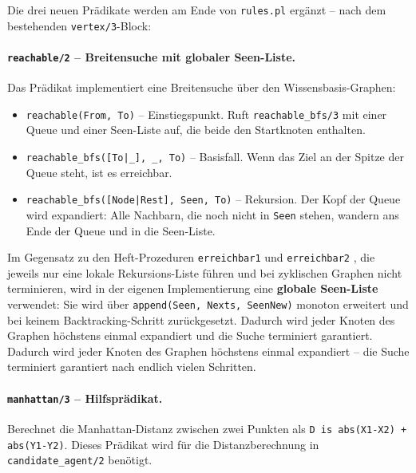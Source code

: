 Die drei neuen Prädikate werden am Ende von \texttt{rules.pl} ergänzt -- nach dem bestehenden \texttt{vertex/3}-Block:



\paragraph{\texttt{reachable/2} – Breitensuche mit globaler Seen-Liste.}
Das Prädikat implementiert eine Breitensuche über den Wissensbasis-Graphen:

\begin{itemize}
    \item \texttt{reachable(From, To)} -- Einstiegspunkt. Ruft \texttt{reachable\_bfs/3} mit einer Queue und einer Seen-Liste auf, die beide den Startknoten enthalten.
    \item \texttt{reachable\_bfs([To|\_], \_, To)} -- Basisfall. Wenn das Ziel an der Spitze der Queue steht, ist es erreichbar.
    \item \texttt{reachable\_bfs([Node|Rest], Seen, To)} -- Rekursion. Der Kopf der Queue wird expandiert: Alle Nachbarn, die noch nicht in \texttt{Seen} stehen, wandern ans Ende der Queue und in die Seen-Liste.
\end{itemize}

Im Gegensatz zu den Heft-Prozeduren \texttt{erreichbar1} und \texttt{erreichbar2} \cite[S. 70\,f.]{4}, die jeweils nur eine lokale Rekursions-Liste führen und bei zyklischen Graphen nicht terminieren, wird in der eigenen Implementierung eine \textbf{globale Seen-Liste} verwendet: Sie wird über \texttt{append(Seen, Nexts, SeenNew)} monoton erweitert und bei keinem Backtracking-Schritt zurückgesetzt. Dadurch wird jeder Knoten des Graphen höchstens einmal expandiert und die Suche terminiert garantiert. Dadurch wird jeder Knoten des Graphen höchstens einmal expandiert -- die Suche terminiert garantiert nach endlich vielen Schritten.

\paragraph{\texttt{manhattan/3} – Hilfsprädikat.}
Berechnet die Manhattan-Distanz zwischen zwei Punkten als \texttt{D is abs(X1-X2) + abs(Y1-Y2)}. Dieses Prädikat wird für die Distanzberechnung in \texttt{candidate\_agent/2} benötigt.

